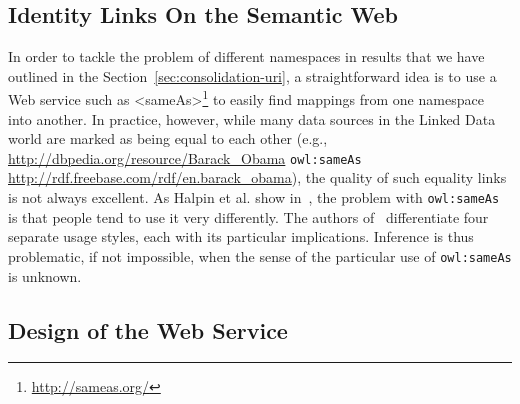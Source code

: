 \documentclass[conference]{IEEEtran}
\begin{document}
\subsection{Identity Links On the Semantic Web}                             \label{sec:sameasorg}
In order to tackle the problem of different namespaces in results that we have outlined in the
Section~\ref{sec:consolidation-uri}, a straightforward idea is to use a Web service such as
<sameAs>\footnote{\url{http://sameas.org/}} to easily find mappings from one namespace into another. In practice,
however, while many data sources in the Linked Data world are marked as being equal to each other (e.g.,
\url{http://dbpedia.org/resource/Barack_Obama} \texttt{owl:sameAs} \url{http://rdf.freebase.com/rdf/en.barack_obama}),
the quality of such equality links is not always excellent. As Halpin et al. show in~\cite{Halpin:SameAs}, the problem
with \texttt{owl:sameAs} is that people tend to use it very differently. The authors of~\cite{Halpin:SameAs}
differentiate four separate usage styles, each with its particular implications. Inference is thus problematic, if not
impossible, when the sense of the particular use of \texttt{owl:sameAs} is unknown.

\subsection{Design of the Web Service}                                      \label{sec:design}
\end{document}
